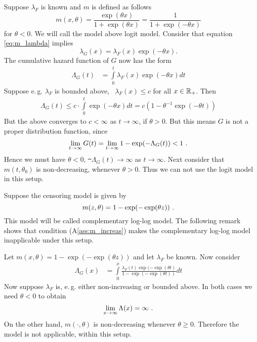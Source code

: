 %
\begin{example}
	Suppose $\lambda_F$ is known and $m$ is defined as follows
	$$m(x,\theta) = \frac{\exp(\theta x)}{1+\exp(\theta x)} = \frac{1}{1+\exp(-\theta x)}$$
	for $\theta < 0$. We will call the model above logit model. Consider that equation \eqref{eq:m_lambda} implies  
	$$\lambda_G(x) = \lambda_F(x)\exp(-\theta x)\textrm{.}$$
	The cumulative hazard function of $G$ now has the form
	\begin{align*}
		\Lambda_G(t) &= \int\limits_0^t \lambda_F(x)\exp(-\theta x)dt
	\end{align*}
	Suppose e.\,g. $\lambda_F$ is bounded above, \ie\  $\lambda_F(x) \leq c$ for all $x\in \mathbb{R}_+$. Then
	\begin{align*}
		\Lambda_G(t) \leq c\cdot \int\limits_0^t \exp(-\theta x)dt  = c\left(1 -\theta^{-1} \exp(-\theta t)\right)
	\end{align*}	
	But the above converges to $c<\infty$ as $t\to\infty$, if $\theta>0$. But this means $G$ is not a proper distribution function, since
	$$\lim\limits_{t\to\infty} G(t) = \lim\limits_{t\to\infty} 1-\exp(-\Lambda_G(t)) < 1\textrm{ .}$$
	Hence we must have $\theta < 0$, \st\ $\Lambda_G(t) \to \infty$ as $t\to\infty$. Next consider that $m(t,\theta_0)$ is non-decreasing, whenever $\theta > 0$. Thus we can not use the logit model in this setup. 
\end{example}
%
\begin{example}
	Suppose the censoring model is given by
	$$m(z, \theta) = 1 - \exp(-\exp(\theta z))\textrm{ .}$$
	This model will be called complementary log-log model. The following remark shows that condition (A\ref{ass:m_increas}) makes the complementary log-log model inapplicable under this setup. 
\end{example}
%
\begin{remark}
	Let $m(x,\theta)= 1 - \exp(-\exp(\theta z))$ and let $\lambda_F$ be known. Now consider
	\begin{align*}
		\Lambda_G(x) &= \int\limits_0^x\frac{\lambda_F(t)\exp(-\exp(\theta t)}{1-\exp(-\exp(\theta t))}dt
	\end{align*}
	Now suppose $\lambda_F$ is, e.\,g. either non-increasing or bounded above. In both cases we need $\theta < 0$ to obtain
	$$\lim_{x\to \infty} \Lambda(x) = \infty \textrm{ .}$$
	On the other hand, $m(\cdot,\theta)$ is non-decreasing whenever $\theta\geq 0$. Therefore the model is not applicable, within this setup.
\end{remark}
